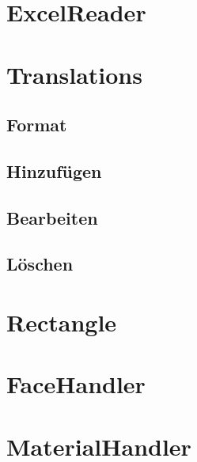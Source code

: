 \documentclass{article}
\begin{document}
	\section{ExcelReader}
	\section{Translations}
		\subsection{Format}
		\subsection{Hinzufügen}
		\subsection{Bearbeiten}
		\subsection{Löschen}
	\section{Rectangle}
	\section{FaceHandler}
	\section{MaterialHandler}
\end{document}
